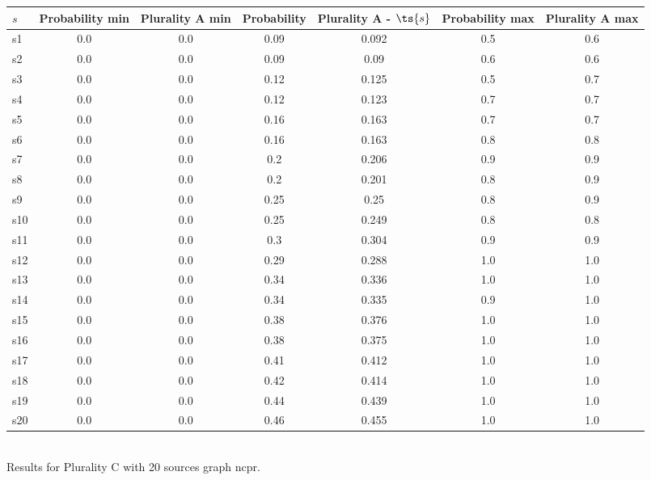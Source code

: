 \documentclass{article}
\begin{document}
\noindent\begin{tabular}{|l|c|c|c|c|c|c|}
\hline
$s$& Probability min & Plurality A min & Probability & Plurality A - $\ts{s}$ & Probability max & Plurality A max\\
\hline
s1 &0.0 & 0.0 & 0.09 & 0.092 & 0.5 & 0.6\\
\hline
s2 &0.0 & 0.0 & 0.09 & 0.09 & 0.6 & 0.6\\
\hline
s3 &0.0 & 0.0 & 0.12 & 0.125 & 0.5 & 0.7\\
\hline
s4 &0.0 & 0.0 & 0.12 & 0.123 & 0.7 & 0.7\\
\hline
s5 &0.0 & 0.0 & 0.16 & 0.163 & 0.7 & 0.7\\
\hline
s6 &0.0 & 0.0 & 0.16 & 0.163 & 0.8 & 0.8\\
\hline
s7 &0.0 & 0.0 & 0.2 & 0.206 & 0.9 & 0.9\\
\hline
s8 &0.0 & 0.0 & 0.2 & 0.201 & 0.8 & 0.9\\
\hline
s9 &0.0 & 0.0 & 0.25 & 0.25 & 0.8 & 0.9\\
\hline
s10 &0.0 & 0.0 & 0.25 & 0.249 & 0.8 & 0.8\\
\hline
s11 &0.0 & 0.0 & 0.3 & 0.304 & 0.9 & 0.9\\
\hline
s12 &0.0 & 0.0 & 0.29 & 0.288 & 1.0 & 1.0\\
\hline
s13 &0.0 & 0.0 & 0.34 & 0.336 & 1.0 & 1.0\\
\hline
s14 &0.0 & 0.0 & 0.34 & 0.335 & 0.9 & 1.0\\
\hline
s15 &0.0 & 0.0 & 0.38 & 0.376 & 1.0 & 1.0\\
\hline
s16 &0.0 & 0.0 & 0.38 & 0.375 & 1.0 & 1.0\\
\hline
s17 &0.0 & 0.0 & 0.41 & 0.412 & 1.0 & 1.0\\
\hline
s18 &0.0 & 0.0 & 0.42 & 0.414 & 1.0 & 1.0\\
\hline
s19 &0.0 & 0.0 & 0.44 & 0.439 & 1.0 & 1.0\\
\hline
s20 &0.0 & 0.0 & 0.46 & 0.455 & 1.0 & 1.0\\
\hline
\end{tabular}\\

\noindent Results for Plurality C with 20 sources graph ncpr.
\end{document}
